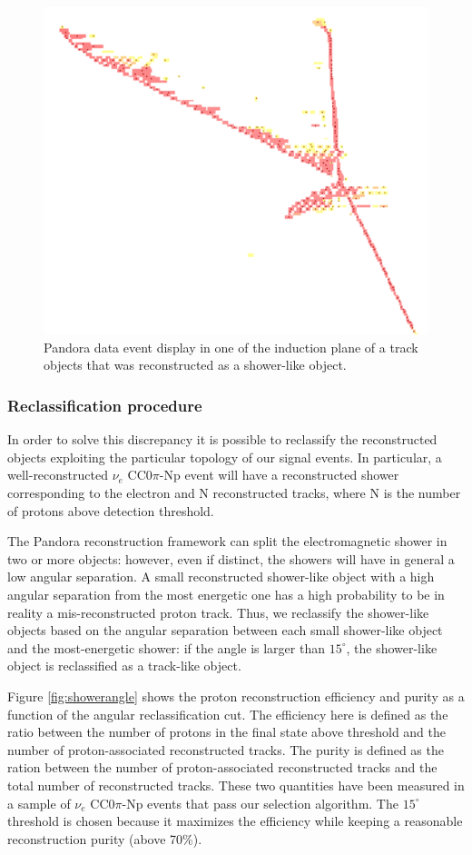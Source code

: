 \begin{figure}[htbp]
\centering
  \includegraphics[width=0.45\linewidth]{figures/pandora.png}
  \caption{Pandora data event display in one of the induction plane of a track objects that was reconstructed as a shower-like object.}
  \label{fig:evdpandora}
\end{figure}

\subsubsection{Reclassification procedure}
In order to solve this discrepancy it is possible to reclassify the reconstructed objects exploiting the particular topology of our signal events. In particular, a well-reconstructed $\nu_{e}$ CC0$\pi$-Np event will have a reconstructed shower corresponding to the electron and N reconstructed tracks, where N is the number of protons above detection threshold. 

The Pandora reconstruction framework can split the electromagnetic shower in two or more objects: however, even if distinct, the showers will have in general a low angular separation. A small reconstructed shower-like object with a high angular separation from the most energetic one has a high probability to be in reality a mis-reconstructed proton track. Thus, we reclassify the shower-like objects based on the angular separation between each small shower-like object and the most-energetic shower: if the angle is larger than $15^{\circ}$, the shower-like object is reclassified as a track-like object.

Figure \ref{fig:showerangle} shows the proton reconstruction efficiency and purity as a function of the angular reclassification cut. The efficiency here is defined as the ratio between the number of protons in the final state above threshold and the number of proton-associated reconstructed tracks. The purity is defined as the ration between the number of proton-associated reconstructed tracks and the total number of reconstructed tracks. These two quantities have been measured in a sample of $\nu_{e}$ CC0$\pi$-Np events that pass our selection algorithm.  The $15^{\circ}$ threshold is chosen because it maximizes the efficiency while keeping a reasonable reconstruction purity (above 70\%).

